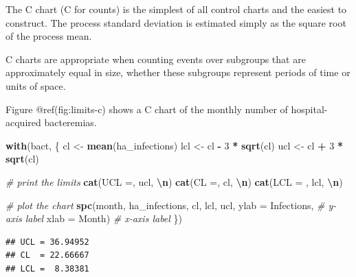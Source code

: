 \documentclass[
]{book}
\newenvironment{Shaded}{\begin{snugshade}}{\end{snugshade}}
\newcommand{\AttributeTok}[1]{\textcolor[rgb]{0.13,0.29,0.53}{#1}}
\newcommand{\CommentTok}[1]{\textcolor[rgb]{0.56,0.35,0.01}{\textit{#1}}}
\newcommand{\DecValTok}[1]{\textcolor[rgb]{0.00,0.00,0.81}{#1}}
\newcommand{\FunctionTok}[1]{\textcolor[rgb]{0.13,0.29,0.53}{\textbf{#1}}}
\newcommand{\NormalTok}[1]{#1}
\newcommand{\OtherTok}[1]{\textcolor[rgb]{0.56,0.35,0.01}{#1}}
\newcommand{\SpecialCharTok}[1]{\textcolor[rgb]{0.81,0.36,0.00}{\textbf{#1}}}
\newcommand{\StringTok}[1]{\textcolor[rgb]{0.31,0.60,0.02}{#1}}
\begin{document}
The C chart (C for counts) is the simplest of all control charts and the
easiest to construct. The process standard deviation is estimated simply
as the square root of the process mean.

C charts are appropriate when counting events over subgroups that are
approximately equal in size, whether these subgroups represent periods
of time or units of space.

Figure @ref(fig:limits-c) shows a C chart of the monthly number of
hospital-acquired bacteremias.

\begin{Shaded}
\begin{Highlighting}[]
\FunctionTok{with}\NormalTok{(bact, \{}
\NormalTok{  cl  }\OtherTok{\textless{}{-}} \FunctionTok{mean}\NormalTok{(ha\_infections)}
\NormalTok{  lcl }\OtherTok{\textless{}{-}}\NormalTok{ cl }\SpecialCharTok{{-}} \DecValTok{3} \SpecialCharTok{*} \FunctionTok{sqrt}\NormalTok{(cl)}
\NormalTok{  ucl }\OtherTok{\textless{}{-}}\NormalTok{ cl }\SpecialCharTok{+} \DecValTok{3} \SpecialCharTok{*} \FunctionTok{sqrt}\NormalTok{(cl)}
  
  \CommentTok{\# print the limits}
  \FunctionTok{cat}\NormalTok{(}\StringTok{\textquotesingle{}UCL =\textquotesingle{}}\NormalTok{,  ucl, }\StringTok{\textquotesingle{}}\SpecialCharTok{\textbackslash{}n}\StringTok{\textquotesingle{}}\NormalTok{)}
  \FunctionTok{cat}\NormalTok{(}\StringTok{\textquotesingle{}CL  =\textquotesingle{}}\NormalTok{,   cl, }\StringTok{\textquotesingle{}}\SpecialCharTok{\textbackslash{}n}\StringTok{\textquotesingle{}}\NormalTok{)}
  \FunctionTok{cat}\NormalTok{(}\StringTok{\textquotesingle{}LCL = \textquotesingle{}}\NormalTok{, lcl, }\StringTok{\textquotesingle{}}\SpecialCharTok{\textbackslash{}n}\StringTok{\textquotesingle{}}\NormalTok{)}
  
  \CommentTok{\# plot the chart}
  \FunctionTok{spc}\NormalTok{(month, ha\_infections,}
\NormalTok{      cl, lcl, ucl,}
      \AttributeTok{ylab =} \StringTok{\textquotesingle{}Infections\textquotesingle{}}\NormalTok{, }\CommentTok{\# y{-}axis label}
      \AttributeTok{xlab =} \StringTok{\textquotesingle{}Month\textquotesingle{}}\NormalTok{)      }\CommentTok{\# x{-}axis label}
\NormalTok{\})}
\end{Highlighting}
\end{Shaded}

\begin{verbatim}
## UCL = 36.94952 
## CL  = 22.66667 
## LCL =  8.38381
\end{verbatim}
\end{document}
